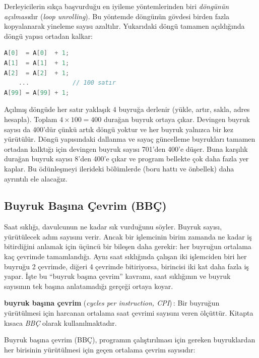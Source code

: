 Derleyicilerin sıkça başvurduğu en iyileme yöntemlerinden biri \emph{döngünün açılması}dır (\textit{loop unrolling}). Bu yöntemde döngünün gövdesi birden fazla kopyalanarak yineleme sayısı azaltılır. Yukarıdaki döngü tamamen açıldığında döngü yapısı ortadan kalkar:

\begin{lstlisting}[language=C]
A[0]  = A[0]  + 1;
A[1]  = A[1]  + 1;
A[2]  = A[2]  + 1;
    ...            // 100 satır
A[99] = A[99] + 1;
\end{lstlisting}

Açılmış döngüde her satır yaklaşık 4 buyruğa derlenir (yükle, artır, sakla, adres hesapla). Toplam $4 \times 100 = 400$ durağan buyruk ortaya çıkar. Devingen buyruk sayısı da 400'dür çünkü artık döngü yoktur ve her buyruk yalnızca bir kez yürütülür. Döngü yapısındaki dallanma ve sayaç güncelleme buyrukları tamamen ortadan kalktığı için devingen buyruk sayısı 701'den 400'e düşer. Buna karşılık durağan buyruk sayısı 8'den 400'e çıkar ve program bellekte çok daha fazla yer kaplar. Bu ödünleşmeyi ilerideki bölümlerde (boru hattı ve önbellek) daha ayrıntılı ele alacağız.

\subsection{Buyruk Başına Çevrim (BBÇ)}
\label{subsec:bbc}

Saat sıklığı, davulcunun ne kadar sık vurduğunu söyler. Buyruk sayısı, yürütülecek adım sayısını verir. Ancak bir işlemcinin birim zamanda ne kadar iş bitirdiğini anlamak için üçüncü bir bileşen daha gerekir: her buyruğun ortalama kaç çevrimde tamamlandığı. Aynı saat sıklığında çalışan iki işlemciden biri her buyruğu 2 çevrimde, diğeri 4 çevrimde bitiriyorsa, birincisi iki kat daha fazla iş yapar. İşte bu ``buyruk başına çevrim'' kavramı, saat sıklığının ve buyruk sayısının tek başına anlatamadığı gerçeği ortaya koyar.

\begin{terimnotu}
\textbf{buyruk başına çevrim} (\emph{cycles per instruction, CPI})\,: Bir buyruğun yürütülmesi için harcanan ortalama saat çevrimi sayısını veren ölçüttür. Kitapta kısaca \emph{BBÇ} olarak kullanılmaktadır.
\end{terimnotu}

Buyruk başına çevrim (BBÇ), programın çalıştırılması için gereken buyruklardan her birisinin yürütülmesi için geçen ortalama çevrim sayısıdır:


